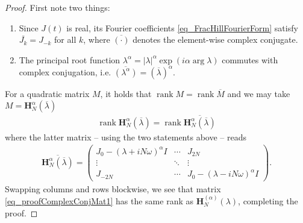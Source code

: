 \documentclass[10pt,a4paper]{amsart}
\newcommand{\hMat}{\mathbf H}
\begin{document}
		\begin{proof}
			First note two things:
			\begin{enumerate}
				\item Since $J(t)$ is real, its Fourier coefficients \eqref{eq_FracHillFourierForm} satisfy $\overline{J_k} = J_{-k}$ for all $k$, where $\overline{(\cdot)}$ denotes the element-wise complex conjugate.
				\item The principal root function $\lambda^\alpha = |\lambda|^\alpha \exp(i\alpha \arg \lambda)$ commutes with complex conjugation, i.e. $\overline{(\lambda^\alpha)} = (\overline \lambda)^\alpha$. 
			\end{enumerate}
			For a quadratic matrix $M$, it holds that $\operatorname{rank}M = \operatorname{rank}\overline{M}$ and we may take $M = \hMat_{N}^\alpha(\overline\lambda)$
			\begin{align}
				\operatorname{rank} \hMat_{N}^\alpha(\overline\lambda) = \operatorname{rank}\overline{\hMat_{N}^\alpha(\overline\lambda)}
			\end{align}
			where the latter matrix -- using the two statements above -- reads
			\begin{align}\label{eq_proofComplexConjMat1}
				\overline{\hMat_{N}^\alpha(\overline\lambda)} = \begin{pmatrix}
					J_0 - (\lambda +iN\omega)^\alpha I & \cdots & J_{2N}\\
					\vdots & \ddots & \vdots \\
					J_{-2N} & \cdots & J_0 - (\lambda -iN\omega)^\alpha I
				\end{pmatrix}.
			\end{align} Swapping columns and rows blockwise, we see that matrix \eqref{eq_proofComplexConjMat1} has the same rank as $\hMat_{N}^{(\alpha)}(\lambda)$, completing the proof.
		\end{proof}
\end{document}
